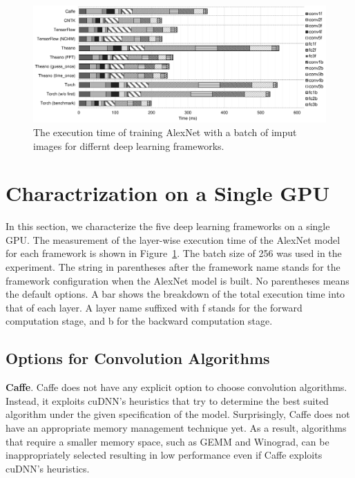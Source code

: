 \begin{figure}[htbp]
  \centering
  \includegraphics[width=\linewidth]{./figures/time_frameworks}
  \caption{%
The execution time of training AlexNet with a batch of imput images for differnt deep learning frameworks. 
\label{fig_time_frameworks}
  }
\end{figure}


\section{Charactrization on a Single GPU}
\label{sec:singlGPU}
In this section, we characterize the five deep learning frameworks on a single GPU. The measurement of the layer-wise execution time of the AlexNet model for each framework is shown in Figure~\ref{fig_time_frameworks}. The batch size of 256 was used in the experiment. The string in parentheses after the framework name stands for the framework configuration when the AlexNet model is built. No parentheses means the default options. A bar shows the breakdown of the total execution time into that of each layer. A layer name suffixed with \textsf{f} stands for the forward computation stage, and \textsf{b} for the backward computation stage.

\subsection{Options for Convolution Algorithms}
{\bf Caffe}. Caffe does not have any explicit option to choose convolution algorithms. Instead, it exploits cuDNN's heuristics that try to determine the best suited algorithm under the given specification of the model. Surprisingly, Caffe does not have an appropriate memory management technique yet. As a result, algorithms that require a smaller memory space, such as GEMM and Winograd, can be inappropriately selected resulting in low performance even if Caffe exploits cuDNN's heuristics. 

